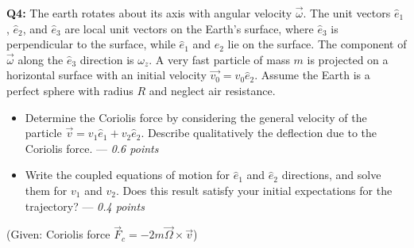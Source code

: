 \documentclass[a4paper,12pt]{article}
\begin{document}
\vspace*{0.2cm}
\textbf{Q4:} The earth rotates about its axis with angular velocity $\vec{\omega}$. The unit vectors $\hat{e}_1$, $\hat{e}_2$, and $\hat{e}_3$ are local unit vectors on the Earth's surface, where $\hat{e}_3$ is perpendicular to the surface, while $\hat{e}_1$ and $\hat{e}_2$ lie on the surface. The component of $\vec{\omega}$ along the $\hat{e}_3$ direction is $\omega_z$. A very fast particle of mass $m$ is projected on a horizontal surface with an initial velocity $\vec{v_0}=v_0\hat{e}_2$. Assume the Earth is a perfect sphere with radius $R$ and neglect air resistance.

\begin{itemize}
    \item[\textbf{a.}] Determine the Coriolis force by considering the general velocity of the particle $\vec{v}=v_1\hat{e}_1+v_2\hat{e}_2$. Describe qualitatively the deflection due to the Coriolis force. --- \textit{0.6 points}
    \item[\textbf{b.}] Write the coupled equations of motion for $\hat{e}_1$ and $\hat{e}_2$ directions, and solve them for $v_1$ and $v_2$. Does this result satisfy your initial expectations for the trajectory? --- \textit{0.4 points}
\end{itemize}


(Given: Coriolis force $\vec{F}_c = -2m \vec{\Omega} \times \vec{v}$)
\end{document}
